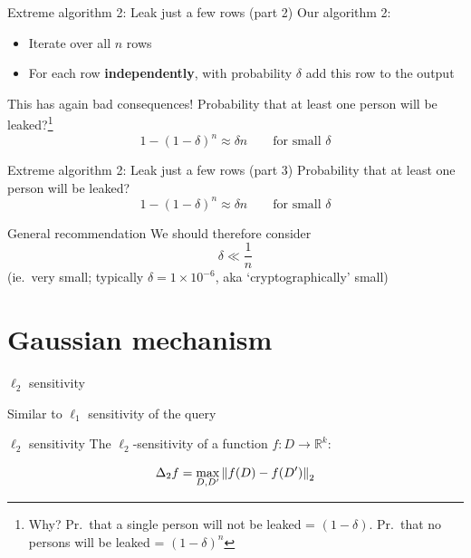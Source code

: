 \documentclass[12pt,aspectratio=169,handout]{beamer}
\begin{document}
\begin{frame}{Extreme algorithm 2: Leak just a few rows (part 2)}
Our algorithm 2:
\begin{itemize}
\item Iterate over all $n$ rows
\item For each row \textbf{independently}, with probability $\delta$ add this row to the output
\end{itemize}

This has again bad consequences!
Probability that at least one person will be leaked?\footnote{
Why? Pr.\ that a single person will not be leaked = $(1 - \delta)$. Pr.\ that no persons will be leaked = $(1 - \delta)^n$
}
$$
1 - (1 - \delta)^n \approx \delta n \qquad \text{for small }\delta
$$

\begin{footnotesize}

\end{footnotesize}
\end{frame}


\begin{frame}{Extreme algorithm 2: Leak just a few rows (part 3)}
Probability that at least one person will be leaked?
$$
1 - (1 - \delta)^n \approx \delta n \qquad \text{for small }\delta
$$

\begin{block}{General recommendation}
We should therefore consider
$$\delta \ll \frac{1}{n}$$
(ie.\ very small; typically $\delta = 1 \times 10^{-6}$, aka `cryptographically' small)
\end{block}

\begin{footnotesize}

\end{footnotesize}
\end{frame}

\section{Gaussian mechanism}


\begin{frame}{$\ell_2$ sensitivity}

Similar to $\ell_1$ sensitivity of the query

\begin{block}{$\ell_2$ sensitivity}
The $\ell_2$-sensitivity of a function $f : D \rightarrow \mathbb{R}^k$:

$$
\Delta_2 f = \max_{D, D'} \norm{f(D) - f(D')}_2
$$
\end{block}

\end{frame}
\end{document}
